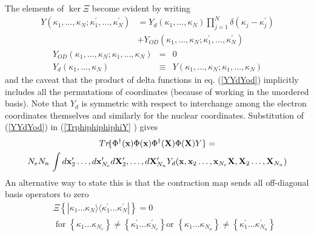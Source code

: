 The elements of $\ker \Xi $ become evident by writing 
\begin{align}
Y(\kappa _{1},\ldots ,\kappa _{N};\kappa _{1}^{\prime },\ldots ,\kappa
_{N}^{\prime })& =Y_{d}(\kappa _{1},\ldots ,\kappa
_{N})\prod_{j=1}^{N}\delta (\kappa _{j}-\kappa _{j}^{\prime })  \nonumber \\
& +Y_{OD}(\kappa _{1},\ldots ,\kappa _{N};\kappa _{1}^{\prime },\ldots
,\kappa _{N}^{\prime })  \label{YYdYod}
\end{align}%
\begin{eqnarray}
Y_{OD}(\kappa _{1},\ldots ,\kappa _{N};\kappa _{1},\ldots ,\kappa _{N}) &=&0
\nonumber \\
Y_{d}(\kappa _{1},\ldots ,\kappa _{N}) &\equiv &Y(\kappa _{1},\ldots ,\kappa
_{N};\kappa _{1},\ldots ,\kappa _{N})
\end{eqnarray}%
and the caveat that the product of delta functions in eq. (\ref{YYdYod})
implicitly includes all the permutations of coordinates (because of working
in the unordered basis). Note that $Y_{d}$ is symmetric with respect to
interchange among the electron coordinates themselves and similarly for the
nuclear coordinates. Substitution of (\ref{YYdYod}) in (\ref{TrphiphiphiphiY}%
) gives 
\begin{gather}
Tr\!\{\Phi ^{\dagger }({\bf x})\Phi ({\bf x})\Phi ^{\dagger }({\bf X})\Phi (%
{\bf X})Y\}=  \nonumber \\
N_{e}N_{n}\,\int d{\bf x}_{2}^{\prime }\ldots ,d{\bf x}_{N_{e}}^{\prime }d%
{\bf X}_{2}^{\prime },\ldots ,d{\bf X}_{N_{n}}^{\prime }Y_{d}({\bf x},{\bf x}%
_{2}\ldots ,{\bf x}_{N_{e}}{\bf X},{\bf X}_{2}\ldots ,{\bf X}_{N_{n}})
\label{ContrYtoYd}
\end{gather}%
An alternative way to state this is that the contraction map sends all
off-diagonal basis operators to zero 
\begin{eqnarray}
&&\Xi \left\{ |\kappa _{1}\ldots \kappa _{N}\rangle \langle \kappa
_{1}^{\prime }\ldots \kappa _{N}^{\prime }|\right\} =0  \nonumber \\
&&\;\text{{for }}\left\{ \kappa _{1}\ldots \kappa _{N_{e}}\right\} \neq
\left\{ \kappa _{1}^{\prime }\ldots \kappa _{N_{e}}^{\prime }\right\} \text{
or }\left\{ \kappa _{1}\ldots \kappa _{N_{n}}\right\} \neq \left\{ \kappa
_{1}^{\prime }\ldots \kappa _{N_{n}}^{\prime }\right\}  \label{zeroeta}
\end{eqnarray}

